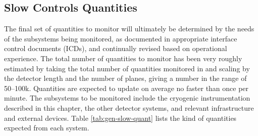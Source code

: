 \subsection{Slow Controls Quantities}
\label{sec:fdgen-slow-cryo-quant}


The final set of quantities to monitor will ultimately be determined
by the needs of the subsystems being monitored, as documented in
appropriate  interface control documents (ICDs), and continually revised based on operational
experience.  The total number of quantities to monitor has been very
roughly estimated by taking the total number of quantities monitored
in \microboone and scaling by the detector length and the number of
planes, giving a number in the range of \numrange{50}{100}k.
Quantities are expected to update on average no faster than once per minute.
The subsystems
to be monitored include the %
cryogenic instrumentation
described in this chapter, the other detector systems, and relevant
infrastructure and external devices. Table \ref{tab:gen-slow-quant}
lists the kind of quantities expected from each system.

